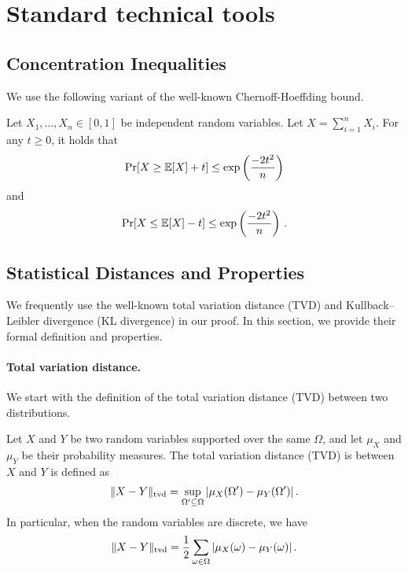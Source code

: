 \section{Standard technical tools}
\label{sec:standatd-tech-tools}

\subsection{Concentration Inequalities}

We use the following variant of the well-known Chernoff-Hoeffding bound.

\begin{lemma}\label{lem:chernoff}
	Let \(X_1, \dotsc, X_n \in [0, 1]\) be independent random variables. Let \(X = \sum_{i = 1}^n X_i\). For any \(t \ge 0\), it holds that 
	\begin{align*}
		\operatorname*{\textnormal{Pr}}[X \ge \operatorname{\mathbb{E}}[X] + t] \le \exp\left(\frac{-2t^2}{n}\right)
	\end{align*}
	and
	\begin{align*}
		\operatorname*{\textnormal{Pr}}[X \le \operatorname{\mathbb{E}}[X] - t] \le \exp\left(\frac{-2t^2}{n}\right)\,.
	\end{align*}
\end{lemma}



\subsection{Statistical Distances and Properties}
\label{sub-app:stat-dist}
We frequently use the well-known total variation distance (TVD) and Kullback–Leibler divergence (KL divergence) in our proof. In this section, we provide their formal definition and properties.


\paragraph{Total variation distance.} 
We start with the definition of the total variation distance (TVD) between two distributions. 
\begin{definition}
	\label{def:tvd}
	Let $X$ and $Y$ be two random variables supported over the same $\Omega$, and let $\mu_X$ and $\mu_Y$ be their probability measures. The total variation distance (TVD) is between $X$ and $Y$ is defined as
	\begin{align*}
		\|X - Y\|_{\mathrm{tvd}} = \sup_{\Omega'\subseteq \Omega}\left\vert{\mu_X(\Omega')-\mu_Y(\Omega')}\right\vert.
	\end{align*}
	In particular, when the random variables are discrete, we have
	\begin{align*}
		\|X - Y\|_{\mathrm{tvd}} = \frac{1}{2}\sum_{\omega\in \Omega}\left\vert{\mu_X(\omega)-\mu_Y(\omega)}\right\vert.
	\end{align*}
\end{definition}

